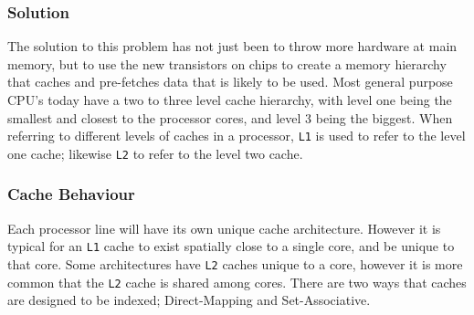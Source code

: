 \documentclass[bsc,frontabs,twoside,singlespacing,parskip,deptreport]{infthesis}     %
\begin{document}
\subsubsection{Solution}
The solution to this problem has not just been to throw more hardware at main memory, but to use the new transistors on chips to create a memory hierarchy that caches and pre-fetches data that is likely to be used. Most general purpose CPU's today have a two to three level cache hierarchy, with level one being the smallest and closest to the processor cores, and level 3 being the biggest. When referring to different levels of caches in a processor, \texttt{L1} is used to refer to the level one cache; likewise \texttt{L2} to refer to the level two cache.
\par
\subsubsection{Cache Behaviour}
Each processor line will have its own unique cache architecture. However it is typical for an \texttt{L1} cache to exist spatially close to a single core, and be unique to that core. Some architectures have \texttt{L2} caches unique to a core, however it is more common that the \texttt{L2} cache is shared among cores. There are two ways that caches are designed to be indexed; Direct-Mapping and Set-Associative.
\end{document}
